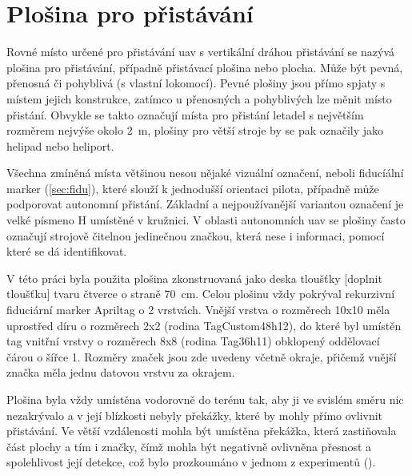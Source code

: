 \chapter{Plošina pro přistávání}
  Rovné místo určené pro přistávání \acrshort{uav} s vertikální dráhou přistávání se nazývá plošina pro přistávání, případně přistávací plošina nebo plocha. Může být pevná, přenosná či pohyblivá (s vlastní lokomocí). Pevné plošiny jsou přímo spjaty s místem jejich konstrukce, zatímco u přenosných a pohyblivých lze měnit místo přistání. Obvykle se takto označují místa pro přistání letadel s největším rozměrem nejvýše okolo 2~m, plošiny pro větší stroje by se pak označily jako helipad nebo heliport.

  Všechna zmíněná místa většinou nesou nějaké vizuální označení, neboli fiducíální marker (\cref{sec:fidu}), které slouží k jednodušší orientaci pilota, případně může podporovat autonomní přistání. Základní a nejpoužívanější variantou označení je velké písmeno H umístěné v kružnici. V oblasti autonomních \acrshort{uav} se plošiny často označují strojově čitelnou jedinečnou značkou, která nese i informaci, pomocí které se dá identifikovat.

  V této práci byla použita plošina zkonstruovaná jako deska tloušťky [doplnit tloušťku] tvaru čtverce o straně 70~cm. Celou plošinu vždy pokrýval rekurzivní fiduciární marker Apriltag o 2 vrstvách. Vnější vrstva o rozměrech 10x10 měla uprostřed díru o rozměrech 2x2 (rodina TagCustom48h12), do které byl umístěn tag vnitřní vrstvy o rozměrech 8x8 (rodina Tag36h11) obklopený oddělovací čárou o šířce 1. Rozměry značek jsou zde uvedeny včetně okraje, přičemž vnější značka měla jednu datovou vrstvu za okrajem.
  
  Plošina byla vždy umístěna vodorovně do terénu tak, aby ji ve svislém směru nic nezakrývalo a v její blízkosti nebyly překážky, které by mohly přímo ovlivnit přistávání. Ve větší vzdálenosti mohla být umístěna překážka, která zastiňovala část plochy a tím i značky, čímž mohla být negativně ovlivněna přesnost a spolehlivost její detekce, což bylo prozkoumáno v jednom z experimentů ().
